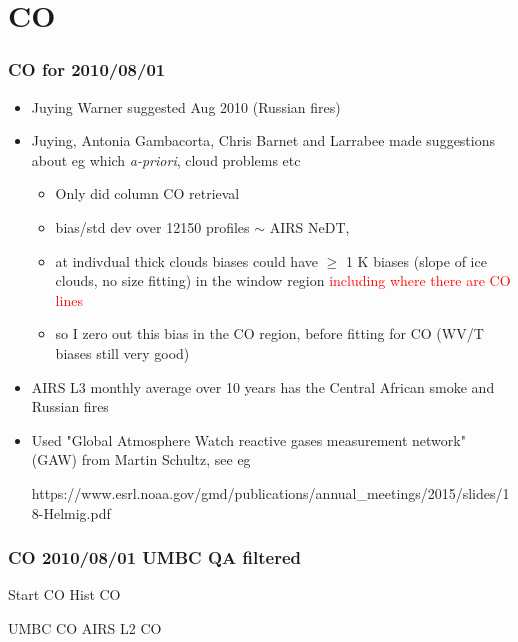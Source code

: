 \documentclass[10pt,t]{beamer}
\begin{document}
\section{CO}
\begin{frame}
  \frametitle{CO for 2010/08/01}
  \begin{itemize}
  \item Juying Warner suggested Aug 2010 (Russian fires)
  \item Juying,  Antonia Gambacorta,  Chris Barnet and Larrabee made suggestions about eg
    which \emph{a-priori}, cloud problems etc
    \begin{itemize}
    \item Only did column CO retrieval    
    \item bias/std dev over 12150 profiles $\sim$  AIRS NeDT,
    \item at indivdual thick clouds biases could have $\geq$ 1 K biases (slope of ice clouds, no size fitting)
      in the window region \textcolor{red}{including where there are CO lines}
    \item so I zero out this bias in the CO region, before fitting for CO (WV/T biases still very good)
    \end{itemize}
  \item AIRS L3 monthly average over 10 years has the Central African smoke and Russian fires
  \item Used "Global Atmosphere Watch reactive gases measurement network"
    (GAW) from Martin Schultz, see eg
    \begin{small} https://www.esrl.noaa.gov/gmd/publications/annual\_meetings/2015/slides/18-Helmig.pdf \end{small}
  \end{itemize}
\end{frame}
\begin{frame}
  \frametitle{CO 2010/08/01 UMBC QA filtered}

  Start CO  \hspace{2.0in} Hist CO\\
  \begin{center}
  \end{center}

  UMBC CO \hspace{2.0in} AIRS L2 CO\\
  \begin{center}
  \end{center}

\end{frame}
\end{document}
